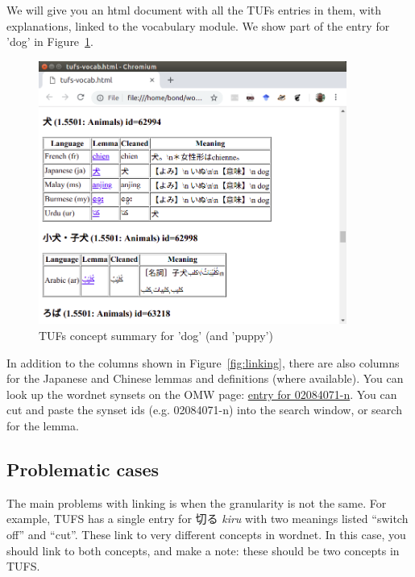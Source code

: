 \documentclass[11pt]{article}
\begin{document}
We will give you an html document with all the TUFs entries in them,
with explanations, linked to the vocabulary module.  We show part of the entry
for 'dog' in Figure~\ref{fig:tufs-inu}.

\begin{figure}[htpb]
  \centering
  \includegraphics[width=0.9\textwidth]{inu-html.png}
  \caption{TUFs concept summary for 'dog' (and 'puppy')}
  \label{fig:tufs-inu}
\end{figure}

In addition to the columns shown in Figure~\ref{fig:linking}, there
are also columns for the Japanese and Chinese lemmas and definitions
(where available).  You can look up the wordnet synsets on the OMW
page:
\href{http://compling.hss.ntu.edu.sg/omw/cgi-bin/wn-grid.cgi?usrname=&gridmode=gridx&synset=02084071-n&lang=eng&lang2=eng}{entry
  for 02084071-n}.  You can cut and paste the synset ids
(e.g. 02084071-n) into the search window, or search for the lemma.


\subsection{Problematic cases}

The main problems with linking is when the granularity is not the
same.  For example, TUFS has a single entry for 切る \textit{kiru} with
two meanings listed ``switch off'' and ``cut''.    These link to very
different concepts in  wordnet.  In this case, you should link to both
concepts, and make a note: these should be two concepts in TUFS.
\end{document}
